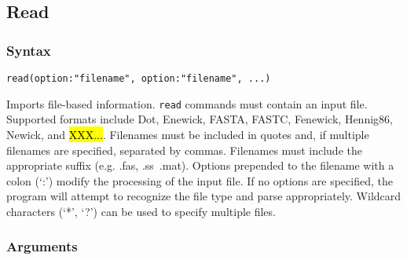 \subsection{Read}
	\subsubsection{Syntax}
		\texttt{read(option:"filename", option:"filename", ...)}
			
	\begin{phygdescription}
		{Imports file-based information. \texttt{read} commands must contain an input file. Supported 
		formats include Dot, Enewick, FASTA, FASTC, Fenewick, Hennig86, Newick, and \hl{XXX...}. 
		Filenames must be included in quotes and, if multiple filenames are specified, separated by 
		commas. Filenames must include the appropriate suffix (e.g. .fas, .ss\, .mat). Options prepended 
		to the filename with a colon (`:') modify the processing of the input file. If no options 
		are specified, the program will attempt to recognize the file type and parse appropriately. Wildcard 
		characters (`*', `?') can be used to specify multiple files.}
	\end{phygdescription}

	\subsubsection{Arguments}
	
